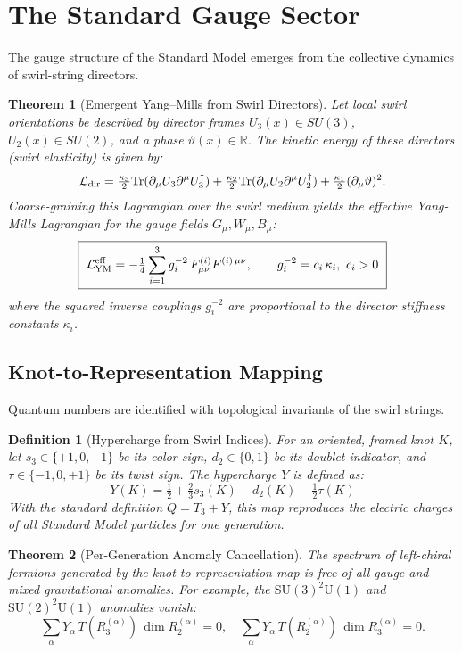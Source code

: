\documentclass[11pt]{article}
\newcommand{\Tr}{\mathrm{Tr}}
\newtheorem{theorem}{Theorem}[section]
\newtheorem{definition}{Definition}[section]
\begin{document}
\section{The Standard Gauge Sector}
\label{sec:gauge_core}
The gauge structure of the Standard Model emerges from the collective dynamics of swirl-string directors.

\begin{theorem}[Emergent Yang–Mills from Swirl Directors]
Let local swirl orientations be described by director frames $U_3(x)\!\in\!SU(3)$, $U_2(x)\!\in\!SU(2)$, and a phase $\vartheta(x)\!\in\!\mathbb R$. The kinetic energy of these directors (swirl elasticity) is given by:
\[ \mathcal L_{\rm dir}=\tfrac{\kappa_3}{2}\Tr(\partial_\mu U_3\partial^\mu U_3^\dagger) +\tfrac{\kappa_2}{2}\Tr(\partial_\mu U_2\partial^\mu U_2^\dagger) +\tfrac{\kappa_1}{2}(\partial_\mu\vartheta)^2. \]
Coarse-graining this Lagrangian over the swirl medium yields the effective Yang-Mills Lagrangian for the gauge fields $G_\mu, W_\mu, B_\mu$:
\[ \boxed{\ \mathcal L_{\rm YM}^{\rm eff}=-\tfrac14\sum_{i=1}^3 g_i^{-2}\,F^{(i)}_{\mu\nu}F^{(i)\,\mu\nu},\qquad g_i^{-2}=c_i\,\kappa_i,\ c_i>0\ } \]
where the squared inverse couplings $g_i^{-2}$ are proportional to the director stiffness constants $\kappa_i$.
\end{theorem}

\subsection{Knot-to-Representation Mapping}
    Quantum numbers are identified with topological invariants of the swirl strings.
    \begin{definition}[Hypercharge from Swirl Indices]
    For an oriented, framed knot $K$, let $s_3\!\in\!\{+1,0,-1\}$ be its color sign, $d_2\!\in\!\{0,1\}$ be its doublet indicator, and $\tau\!\in\!\{-1,0,+1\}$ be its twist sign. The hypercharge $Y$ is defined as:
    \[ \boxed{ Y(K)=\tfrac{1}{2}+\tfrac{2}{3}s_3(K)-d_2(K)-\tfrac{1}{2}\tau(K) } \]
    With the standard definition $Q=T_3+Y$, this map reproduces the electric charges of all Standard Model particles for one generation.
    \end{definition}

    \begin{theorem}[Per-Generation Anomaly Cancellation]
    The spectrum of left-chiral fermions generated by the knot-to-representation map is free of all gauge and mixed gravitational anomalies. For example, the $\mathrm{SU}(3)^2\mathrm{U}(1)$ and $\mathrm{SU}(2)^2\mathrm{U}(1)$ anomalies vanish:
    \[
        \sum_\alpha Y_\alpha\,T(R^{(\alpha)}_3)\,\dim R^{(\alpha)}_2=0,\quad
        \sum_\alpha Y_\alpha\,T(R^{(\alpha)}_2)\,\dim R^{(\alpha)}_3=0.
    \]
    \end{theorem}
\end{document}
